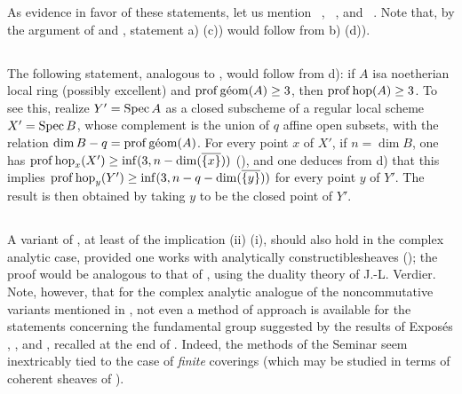 As evidence in favor of these statements, let us mention ~, ~, and ~. Note that, by the argument of  and , statement a) (\resp c)) would follow from b) (\resp d)).

\subsection{\texorpdfstring{}{XIV.6.3}} \label{XIV.6.3}
The following statement, analogous to , would follow from d): if $A$ is\pageoriginale a noetherian local ring (possibly excellent) and $\operatorname{prof} \operatorname{g\acute{e}om} (A) \geq 3$, then $\operatorname{prof} \operatorname{hop} (A) \geq 3$. To see this, realize $Y'=\operatorname{Spec} A$ as a closed subscheme of a regular local scheme $X'=\operatorname{Spec} B$, whose complement is the union of $q$ affine open subsets, with the relation $\dim B -q=\operatorname{prof} \operatorname{g\acute{e}om}(A)$. For every point $x$ of $X'$, if $n=\dim B$, one has $\operatorname{prof} \operatorname{hop}_x(X') \geq \inf(3, n-\dim(\overline{\{x\}}))$ (\cf {}), and one deduces from d) that this implies $\operatorname{prof} \operatorname{hop}_y(Y') \geq \inf(3, n-q-\dim(\overline{\{y\}}))$ for every point $y$ of $Y'$. The result is then obtained by taking $y$ to be the closed point of $Y'$.

\subsection{\texorpdfstring{}{XIV.6.4}} \label{XIV.6.4}
A variant of , at least of the implication \textup{(ii)} \ALORS \textup{(i)}, should also hold in the complex analytic case, provided one works with \og analytically constructible\fg sheaves (\cf {}); the proof would be analogous to that of , using the duality theory of J.-L. Verdier. Note, however, that for the complex analytic analogue of the noncommutative variants mentioned in , not even a method of approach is available for the statements concerning the fundamental group suggested by the results of Expos\'{e}s , , and , recalled at the end of . Indeed, the methods of the Seminar seem inextricably tied to the case of \emph{finite} coverings (which may be studied in terms of coherent sheaves of ).

